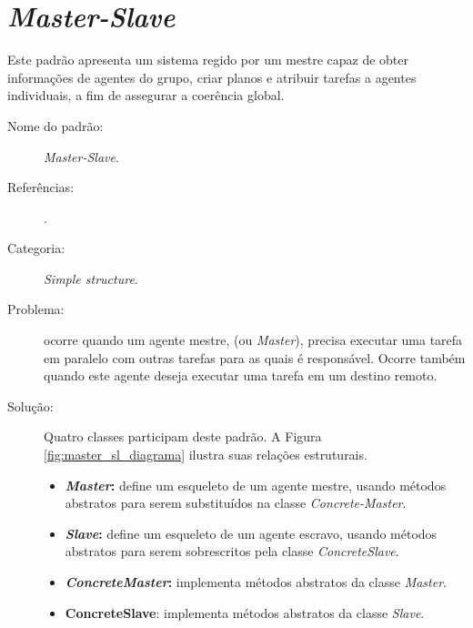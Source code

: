 \chapter{\textit{Master-Slave}}\label{sec:master_slave}

Este padrão apresenta um sistema regido por um mestre capaz de obter informações de agentes do grupo, criar planos e atribuir tarefas a agentes individuais, a fim de assegurar a coerência global.


\begin{description}
  \item[Nome do padrão:] \textit{Master-Slave}.
    \item[Referências:]    .
    \item[Categoria:] \textit{Simple structure}.
    \item[Problema:] ocorre quando um agente mestre, (ou \textit{Master}), precisa executar uma tarefa em paralelo com outras tarefas para as quais é responsável. Ocorre também quando este agente deseja executar uma tarefa em um destino remoto.
    \item[Solução:] Quatro classes participam deste padrão. A Figura \ref{fig:master_sl_diagrama} ilustra suas relações estruturais.
    \begin{itemize} 
    \item \textbf{\textit{Master}:} define um esqueleto de um agente mestre, usando métodos abstratos para serem substituídos na classe \textit{Concrete-Master}.
    \item \textbf{\textit{Slave}:} define um esqueleto de um agente escravo, usando métodos abstratos para serem sobrescritos pela classe \textit{ConcreteSlave}.
    \item \textbf{\textit{ConcreteMaster}: }implementa métodos abstratos da classe \textit{Master}.
    \item \textbf{ConcreteSlave}: implementa métodos abstratos da classe \textit{Slave}.
    \end{itemize}



\end{description}
